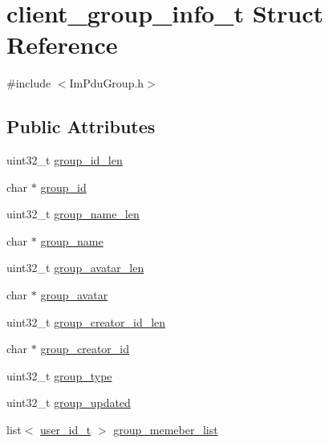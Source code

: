 \hypertarget{structclient__group__info__t}{}\section{client\+\_\+group\+\_\+info\+\_\+t Struct Reference}
\label{structclient__group__info__t}


{\ttfamily \#include $<$Im\+Pdu\+Group.\+h$>$}

\subsection*{Public Attributes}
\begin{DoxyCompactItemize}
\item 
uint32\+\_\+t \hyperlink{structclient__group__info__t_ab72223d19e17f8c55c7ede0302ea0e23}{group\+\_\+id\+\_\+len}
\item 
char $\ast$ \hyperlink{structclient__group__info__t_abc5f1b53c6470e5a73323562f9919b9e}{group\+\_\+id}
\item 
uint32\+\_\+t \hyperlink{structclient__group__info__t_aedf6577ceb273430fc1d47a74e1af812}{group\+\_\+name\+\_\+len}
\item 
char $\ast$ \hyperlink{structclient__group__info__t_a8d67517e0bf6dea1c802718cdbce7553}{group\+\_\+name}
\item 
uint32\+\_\+t \hyperlink{structclient__group__info__t_a06b0ef853bd2b35967475df03b4ce229}{group\+\_\+avatar\+\_\+len}
\item 
char $\ast$ \hyperlink{structclient__group__info__t_a24675c9103d09f14aa45ec61994ae0e0}{group\+\_\+avatar}
\item 
uint32\+\_\+t \hyperlink{structclient__group__info__t_a21d5dfdff5478f21487b900ac3a2b242}{group\+\_\+creator\+\_\+id\+\_\+len}
\item 
char $\ast$ \hyperlink{structclient__group__info__t_a58267efe918cd8d8cf72f8cedba4d2d1}{group\+\_\+creator\+\_\+id}
\item 
uint32\+\_\+t \hyperlink{structclient__group__info__t_a7693ff5282e962e4631c82d7a74e7dff}{group\+\_\+type}
\item 
uint32\+\_\+t \hyperlink{structclient__group__info__t_aff62edcbdde943ce716c870304d3325b}{group\+\_\+updated}
\item 
list$<$ \hyperlink{structuser__id__t}{user\+\_\+id\+\_\+t} $>$ \hyperlink{structclient__group__info__t_ada105ab1d126f4163093ef7147e40f7d}{group\+\_\+memeber\+\_\+list}
\end{DoxyCompactItemize}


